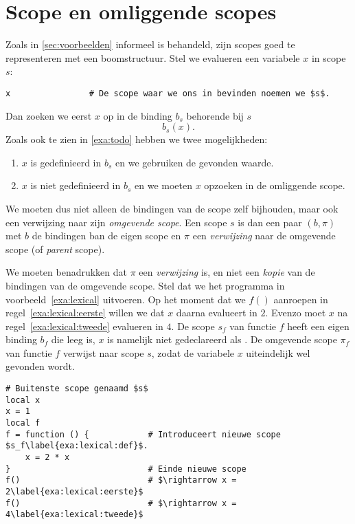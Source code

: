 \section{Scope en omliggende scopes}

Zoals in \ref{sec:voorbeelden} informeel is behandeld, zijn scopes goed te representeren met een boomstructuur. Stel we evalueren een variabele $x$ in scope $s$:
\begin{lstlisting}
x                # De scope waar we ons in bevinden noemen we $s$.
\end{lstlisting}
Dan zoeken we eerst $x$ op in de binding $b_s$ behorende bij $s$
\begin{equation}
  b_s(x).
\end{equation}
Zoals ook te zien in \ref{exa:todo} hebben we twee mogelijkheden:
\begin{enumerate}
  \item $x$ is gedefinieerd in $b_s$ en we gebruiken de gevonden waarde.
  \item $x$ is niet gedefinieerd in $b_s$ en we moeten $x$ opzoeken in de omliggende scope.
\end{enumerate}
We moeten dus niet alleen de bindingen van de scope zelf bijhouden, maar ook een verwijzing naar zijn \emph{omgevende scope}. Een scope $s$ is dan een paar $(b,\pi)$ met $b$ de bindingen ban de eigen scope en $\pi$ een \emph{verwijzing} naar de omgevende scope (of \emph{parent} scope).

We moeten benadrukken dat $\pi$ een \emph{verwijzing} is, en niet een \emph{kopie} van de bindingen van de omgevende scope. Stel dat we het programma in voorbeeld~\ref{exa:lexical} uitvoeren. Op het moment dat we $f()$ aanroepen in regel~\ref{exa:lexical:eerste} willen we dat $x$ daarna evalueert in $2$. Evenzo moet $x$ na regel~\ref{exa:lexical:tweede} evalueren in $4$. De scope $s_f$ van functie $f$ heeft een eigen binding $b_f$ die leeg is, $x$ is namelijk niet gedeclareerd als \LOCAL. De omgevende scope $\pi_f$ van functie $f$ verwijst naar scope $s$, zodat de variabele $x$ uiteindelijk wel gevonden wordt.

\begin{lstlisting}[caption=Lexicale scope,label=exa:lexical]
# Buitenste scope genaamd $s$
local x
x = 1
local f
f = function () {            # Introduceert nieuwe scope $s_f\label{exa:lexical:def}$.
    x = 2 * x
}                            # Einde nieuwe scope
f()                          # $\rightarrow x = 2\label{exa:lexical:eerste}$
f()                          # $\rightarrow x = 4\label{exa:lexical:tweede}$
\end{lstlisting}

